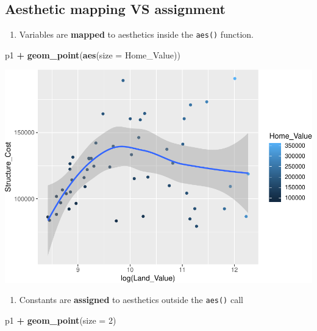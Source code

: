 \documentclass[]{book}
\newenvironment{Shaded}{\begin{snugshade}}{\end{snugshade}}
\newcommand{\DataTypeTok}[1]{\textcolor[rgb]{0.13,0.29,0.53}{#1}}
\newcommand{\DecValTok}[1]{\textcolor[rgb]{0.00,0.00,0.81}{#1}}
\newcommand{\KeywordTok}[1]{\textcolor[rgb]{0.13,0.29,0.53}{\textbf{#1}}}
\newcommand{\NormalTok}[1]{#1}
\newcommand{\OperatorTok}[1]{\textcolor[rgb]{0.81,0.36,0.00}{\textbf{#1}}}
\newcommand{\StringTok}[1]{\textcolor[rgb]{0.31,0.60,0.02}{#1}}
\providecommand{\tightlist}{%
  \setlength{\itemsep}{0pt}\setlength{\parskip}{0pt}}
\begin{document}
\hypertarget{aesthetic-mapping-vs-assignment}{%
\subsection{Aesthetic mapping VS assignment}\label{aesthetic-mapping-vs-assignment}}

\begin{enumerate}
\def\labelenumi{\arabic{enumi}.}
\tightlist
\item
  Variables are \textbf{mapped} to aesthetics inside the \texttt{aes()} function.
\end{enumerate}

\begin{Shaded}
\begin{Highlighting}[]
\NormalTok{p1 }\OperatorTok{+}
\StringTok{  }\KeywordTok{geom_point}\NormalTok{(}\KeywordTok{aes}\NormalTok{(}\DataTypeTok{size =}\NormalTok{ Home_Value))}
\end{Highlighting}
\end{Shaded}

\includegraphics{R/Rgraphics/figures/unnamed-chunk-149-1.pdf}

\begin{enumerate}
\def\labelenumi{\arabic{enumi}.}
\setcounter{enumi}{1}
\tightlist
\item
  Constants are \textbf{assigned} to aesthetics outside the \texttt{aes()} call
\end{enumerate}

\begin{Shaded}
\begin{Highlighting}[]
\NormalTok{p1 }\OperatorTok{+}
\StringTok{  }\KeywordTok{geom_point}\NormalTok{(}\DataTypeTok{size =} \DecValTok{2}\NormalTok{)}
\end{Highlighting}
\end{Shaded}
\end{document}

